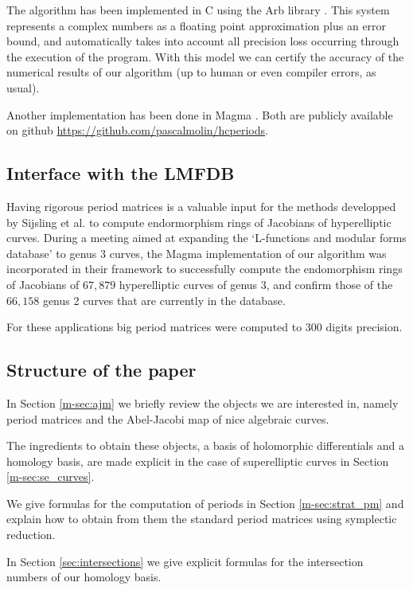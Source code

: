 \documentclass[main.tex]{subfiles}
\begin{document}
  The algorithm has been implemented in C using the Arb library \cite{Johansson2013arb}.
  This system represents a complex numbers as a floating point approximation
  plus an error bound, and automatically
  takes into account all precision loss occurring through the
  execution of the program. With this model we can certify
  the accuracy of the numerical results of our algorithm (up to human or even
  compiler errors, as usual).

  Another implementation has been done in Magma \cite{Magma}. Both are publicly available
  on github \url{https://github.com/pascalmolin/hcperiods}.

  \subsection{Interface with the LMFDB}

  Having rigorous period matrices is a valuable input for the methods developped by
  Sijsling et al. \cite{CMSVEndos} to compute endormorphism rings of Jacobians of hyperelliptic
  curves.
  During a meeting aimed at expanding the `L-functions and modular forms database' \cite[LMFDB]{lmfdb}
  to genus $3$ curves, the Magma implementation of our algorithm was incorporated in their framework
  to successfully compute the endomorphism rings of Jacobians of $67,879$ hyperelliptic
  curves of genus $3$, and confirm those of the $66,158$ genus
  2 curves that are currently in the database.

  For these applications big period matrices were computed to $300$ digits precision.

  \subsection{Structure of the paper}

  In Section \ref{m-sec:ajm} we briefly review the objects we are interested
  in, namely period matrices and the Abel-Jacobi map of nice algebraic curves.

  The ingredients to obtain these objects, a basis of holomorphic differentials
  and a homology basis, are made explicit in the case of superelliptic curves
  in Section \ref{m-sec:se_curves}.

  We give formulas for the computation of periods in Section
  \ref{m-sec:strat_pm} and explain how to obtain from them the standard period
  matrices using symplectic reduction.

  In Section \ref{sec:intersections} we give explicit formulas for the
  intersection numbers of our homology basis.
\end{document}
